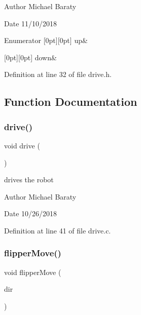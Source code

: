 \begin{DoxyAuthor}{Author}
Michael Baraty 
\end{DoxyAuthor}
\begin{DoxyDate}{Date}
11/10/2018 
\end{DoxyDate}
\begin{DoxyEnumFields}{Enumerator}
[0pt][0pt]{}\mbox{\label{drive_8h_a2f0911ee5d810257dbf1bdb35da96fbcaebc281bf093563220c2270ba57dedfce}} 
up&\\
\hline

[0pt][0pt]{}\mbox{\label{drive_8h_a2f0911ee5d810257dbf1bdb35da96fbca00156fc42b17a87d0746d97b42caf296}} 
down&\\
\hline

\end{DoxyEnumFields}


Definition at line 32 of file drive.\+h.



\subsection{Function Documentation}
\mbox{\label{drive_8h_a928e32686c7e00c1ecde24c3da3019f7}} 
\subsubsection{drive()}
{\footnotesize\ttfamily void drive (\begin{DoxyParamCaption}{ }\end{DoxyParamCaption})}



drives the robot 

\begin{DoxyAuthor}{Author}
Michael Baraty 
\end{DoxyAuthor}
\begin{DoxyDate}{Date}
10/26/2018 
\end{DoxyDate}


Definition at line 41 of file drive.\+c.

\mbox{\label{drive_8h_a8fb87ee769c5cb856ac57381622779b0}} 
\subsubsection{flipper\+Move()}
{\footnotesize\ttfamily void flipper\+Move (\begin{DoxyParamCaption}\item[{\textbf{ Flipper\+Direction}}]{dir }\end{DoxyParamCaption})}



